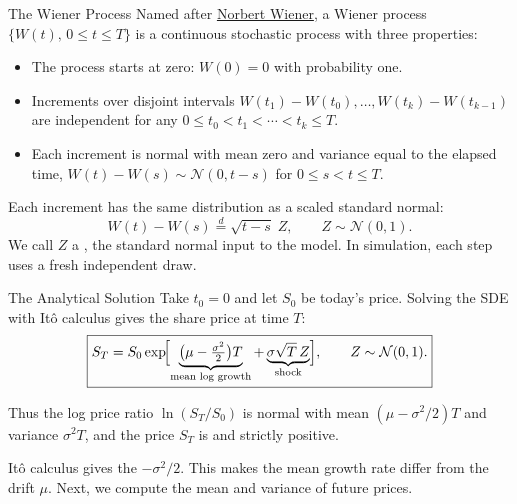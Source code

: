 \documentclass[aspectratio=169,11pt]{beamer}
\begin{document}
\begin{frame}{The Wiener Process}
  Named after \href{https://en.wikipedia.org/wiki/Norbert_Wiener}{Norbert Wiener},
  a Wiener process $\{W(t),\,0\le t\le T\}$ is a continuous stochastic
  process with three properties:

  \vspace{0.6em}
  \begin{itemize}\setlength{\itemsep}{0.6em}
    \item The process starts at zero: $W(0)=0$ with probability one.
    \item Increments over disjoint intervals
      $W(t_1)-W(t_0),\ldots,W(t_k)-W(t_{k-1})$ are independent for any
      $0\le t_0<t_1<\cdots<t_k\le T$.
    \item Each increment is normal with mean zero and variance equal to the
      elapsed time, $W(t)-W(s)\sim\mathcal{N}(0,t-s)$ for $0\le s<t\le T$.
  \end{itemize}

  \vspace{0.5em}
  Each increment has the same distribution as a scaled standard normal:
  \[
    W(t)-W(s)\overset{d}{=}\sqrt{t-s}\;Z,\qquad Z\sim\mathcal{N}(0,1).
  \]
  We call $Z$ a , the standard normal input to the model.
  In simulation, each step uses a fresh independent draw.
\end{frame}

\begin{frame}{The Analytical Solution}
  Take $t_0=0$ and let $S_0$ be today's price. Solving the SDE with It\^o
  calculus gives the share price at time $T$:
  \[
    \boxed{S_T=S_0\exp\!\Bigl[
      \underbrace{\bigl(\mu-\tfrac{\sigma^2}{2}\bigr)T}_{\text{mean log growth}}
      +\underbrace{\sigma\sqrt{T}\,Z}_{\text{shock}}\Bigr],
    \qquad Z\sim\mathcal{N}(0,1).}
  \]

  Thus the log price ratio $\ln(S_T/S_0)$ is normal with mean
  $(\mu-\sigma^2/2)T$ and variance $\sigma^2T$, and the price $S_T$ is
   and strictly positive.

  \vspace{0.4em}
  It\^o calculus gives the  $-\sigma^2/2$.
  This makes the mean growth rate differ from the drift $\mu$. Next, we
  compute the mean and variance of future prices.

\end{frame}
\end{document}
